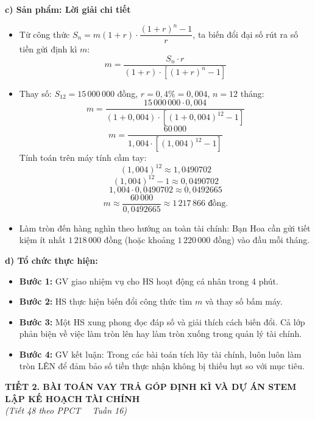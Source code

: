 \documentclass[12pt, a4paper]{article}
\begin{document}
\noindent \textbf{c) Sản phẩm: Lời giải chi tiết}
\begin{itemize}
    \item Từ công thức $S_n = m(1+r) \cdot \dfrac{(1+r)^n - 1}{r}$, ta biến đổi đại số rút ra số tiền gửi định kì $m$:
    \begin{equation}
        m = \dfrac{S_n \cdot r}{(1+r) \cdot \left[(1+r)^n - 1\right]}
    \end{equation}
    \item Thay số: $S_{12} = 15\,000\,000$ đồng, $r = 0{,}4\% = 0{,}004$, $n = 12$ tháng:
    $$m = \dfrac{15\,000\,000 \cdot 0{,}004}{(1 + 0{,}004) \cdot \left[(1 + 0{,}004)^{12} - 1\right]}$$
    $$m = \dfrac{60\,000}{1{,}004 \cdot \left[(1{,}004)^{12} - 1\right]}$$
    Tính toán trên máy tính cầm tay:
    $$(1{,}004)^{12} \approx 1{,}0490702$$
    $$(1{,}004)^{12} - 1 \approx 0{,}0490702$$
    $$1{,}004 \cdot 0{,}0490702 \approx 0{,}0492665$$
    $$m \approx \dfrac{60\,000}{0{,}0492665} \approx 1\,217\,866\text{ đồng.}$$
    \item Làm tròn đến hàng nghìn theo hướng an toàn tài chính: Bạn Hoa cần gửi tiết kiệm ít nhất $1\,218\,000$ đồng (hoặc khoảng $1\,220\,000$ đồng) vào đầu mỗi tháng.
\end{itemize}

\noindent \textbf{d) Tổ chức thực hiện:}
\begin{itemize}
    \item \textbf{Bước 1:} GV giao nhiệm vụ cho HS hoạt động cá nhân trong 4 phút.
    \item \textbf{Bước 2:} HS thực hiện biến đổi công thức tìm $m$ và thay số bấm máy.
    \item \textbf{Bước 3:} Một HS xung phong đọc đáp số và giải thích cách biến đổi. Cả lớp phản biện về việc làm tròn lên hay làm tròn xuống trong quản lý tài chính.
    \item \textbf{Bước 4:} GV kết luận: Trong các bài toán tích lũy tài chính, luôn luôn làm tròn LÊN để đảm bảo số tiền thực nhận không bị thiếu hụt so với mục tiêu.
\end{itemize}

\vspace{10pt}
\begin{center}
    {\fontsize{13pt}{16pt}\selectfont \textbf{TIẾT 2. BÀI TOÁN VAY TRẢ GÓP ĐỊNH KÌ VÀ DỰ ÁN STEM LẬP KẾ HOẠCH TÀI CHÍNH}}\\[2pt]
    \textit{(Tiết 48 theo PPCT \ \textbar \ Tuần 16)}
\end{center}
\end{document}
